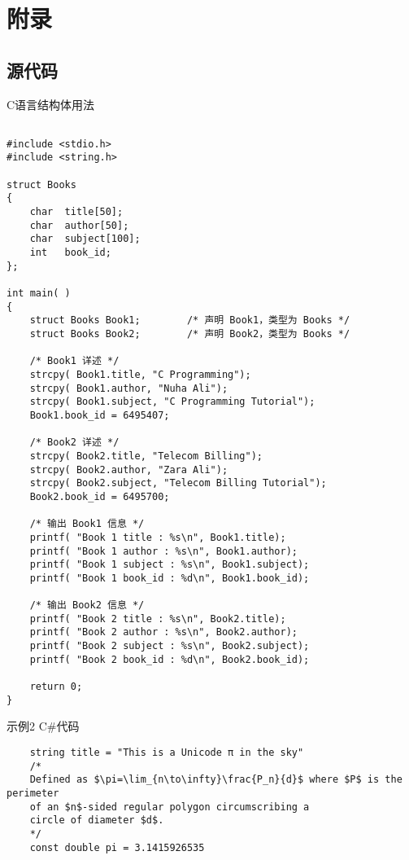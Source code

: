 \chapter{附录}
\section{源代码}
\mylineskip
{\noindent C语言结构体用法}
\renewcommand{\theFancyVerbLine}{\sffamily\textcolor[rgb]{0.6,0.2,0.3}{\normalsize\oldstylenums{\arabic{FancyVerbLine}}}}
\begin{verbatim}

#include <stdio.h>
#include <string.h>

struct Books
{
    char  title[50];
    char  author[50];
    char  subject[100];
    int   book_id;
};

int main( )
{
    struct Books Book1;        /* 声明 Book1，类型为 Books */
    struct Books Book2;        /* 声明 Book2，类型为 Books */
    
    /* Book1 详述 */
    strcpy( Book1.title, "C Programming");
    strcpy( Book1.author, "Nuha Ali"); 
    strcpy( Book1.subject, "C Programming Tutorial");
    Book1.book_id = 6495407;
    
    /* Book2 详述 */
    strcpy( Book2.title, "Telecom Billing");
    strcpy( Book2.author, "Zara Ali");
    strcpy( Book2.subject, "Telecom Billing Tutorial");
    Book2.book_id = 6495700;
    
    /* 输出 Book1 信息 */
    printf( "Book 1 title : %s\n", Book1.title);
    printf( "Book 1 author : %s\n", Book1.author);
    printf( "Book 1 subject : %s\n", Book1.subject);
    printf( "Book 1 book_id : %d\n", Book1.book_id);
    
    /* 输出 Book2 信息 */
    printf( "Book 2 title : %s\n", Book2.title);
    printf( "Book 2 author : %s\n", Book2.author);
    printf( "Book 2 subject : %s\n", Book2.subject);
    printf( "Book 2 book_id : %d\n", Book2.book_id);
    
    return 0;
}
\end{verbatim}

{\noindent 示例2 C\#代码}
\begin{verbatim}
    string title = "This is a Unicode π in the sky"
    /*
    Defined as $\pi=\lim_{n\to\infty}\frac{P_n}{d}$ where $P$ is the perimeter
    of an $n$-sided regular polygon circumscribing a
    circle of diameter $d$.
    */
    const double pi = 3.1415926535
\end{verbatim}


